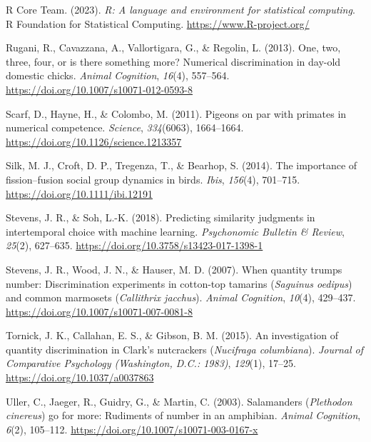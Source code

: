 \documentclass[
  ,pub,floatsintext]{apa6}
\newlength{\cslhangindent}
\newlength{\cslentryspacingunit} %
\newenvironment{CSLReferences}[2] %
 {%
  \setlength{\parindent}{0pt}
  \ifodd #1
  \let\oldpar\par
  \def\par{\hangindent=\cslhangindent\oldpar}
  \fi
  \setlength{\parskip}{#2\cslentryspacingunit}
 }%
 {}
\begin{document}
\begin{CSLReferences}{1}{0}
\leavevmode{}%
R Core Team. (2023). \emph{R: A language and environment for statistical computing}. R Foundation for Statistical Computing. \url{https://www.R-project.org/}

\leavevmode{}%
Rugani, R., Cavazzana, A., Vallortigara, G., \& Regolin, L. (2013). One, two, three, four, or is there something more? {Numerical} discrimination in day-old domestic chicks. \emph{Animal Cognition}, \emph{16}(4), 557--564. \url{https://doi.org/10.1007/s10071-012-0593-8}

\leavevmode{}%
Scarf, D., Hayne, H., \& Colombo, M. (2011). Pigeons on par with primates in numerical competence. \emph{Science}, \emph{334}(6063), 1664--1664. \url{https://doi.org/10.1126/science.1213357}

\leavevmode{}%
Silk, M. J., Croft, D. P., Tregenza, T., \& Bearhop, S. (2014). The importance of fission--fusion social group dynamics in birds. \emph{Ibis}, \emph{156}(4), 701--715. \url{https://doi.org/10.1111/ibi.12191}

\leavevmode{}%
Stevens, J. R., \& Soh, L.-K. (2018). Predicting similarity judgments in intertemporal choice with machine learning. \emph{Psychonomic Bulletin \& Review}, \emph{25}(2), 627--635. \url{https://doi.org/10.3758/s13423-017-1398-1}

\leavevmode{}%
Stevens, J. R., Wood, J. N., \& Hauser, M. D. (2007). When quantity trumps number: Discrimination experiments in cotton-top tamarins (\emph{{Saguinus} oedipus}) and common marmosets (\emph{{Callithrix} jacchus}). \emph{Animal Cognition}, \emph{10}(4), 429--437. \url{https://doi.org/10.1007/s10071-007-0081-8}

\leavevmode{}%
Tornick, J. K., Callahan, E. S., \& Gibson, B. M. (2015). An investigation of quantity discrimination in {Clark}'s nutcrackers (\emph{{Nucifraga} columbiana}). \emph{Journal of Comparative Psychology (Washington, D.C.: 1983)}, \emph{129}(1), 17--25. \url{https://doi.org/10.1037/a0037863}

\leavevmode{}%
Uller, C., Jaeger, R., Guidry, G., \& Martin, C. (2003). Salamanders (\emph{{Plethodon} cinereus}) go for more: Rudiments of number in an amphibian. \emph{Animal Cognition}, \emph{6}(2), 105--112. \url{https://doi.org/10.1007/s10071-003-0167-x}


\end{CSLReferences}
\end{document}
